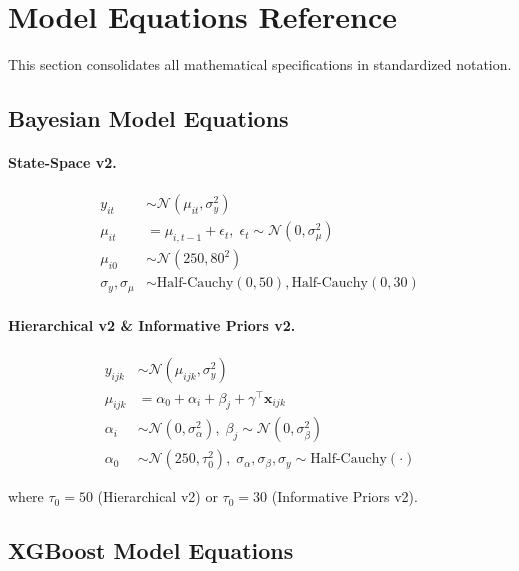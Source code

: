 \section{Model Equations Reference}
\label{sec:equations-reference}

This section consolidates all mathematical specifications in standardized notation.

\subsection{Bayesian Model Equations}

\paragraph{State-Space v2.}
\begin{align}
y_{it} &\sim \mathcal{N}(\mu_{it}, \sigma_y^2) \tag{Observation} \\
\mu_{it} &= \mu_{i,t-1} + \epsilon_t, \; \epsilon_t \sim \mathcal{N}(0, \sigma_\mu^2) \tag{Transition} \\
\mu_{i0} &\sim \mathcal{N}(250, 80^2) \tag{Initial state} \\
\sigma_y, \sigma_\mu &\sim \text{Half-Cauchy}(0, 50), \text{Half-Cauchy}(0, 30) \tag{Priors}
\end{align}

\paragraph{Hierarchical v2 \& Informative Priors v2.}
\begin{align}
y_{ijk} &\sim \mathcal{N}(\mu_{ijk}, \sigma_y^2) \tag{Observation} \\
\mu_{ijk} &= \alpha_0 + \alpha_i + \beta_j + \gamma^\top \mathbf{x}_{ijk} \tag{Linear predictor} \\
\alpha_i &\sim \mathcal{N}(0, \sigma_\alpha^2), \; \beta_j \sim \mathcal{N}(0, \sigma_\beta^2) \tag{Random effects} \\
\alpha_0 &\sim \mathcal{N}(250, \tau_0^2), \; \sigma_\alpha, \sigma_\beta, \sigma_y \sim \text{Half-Cauchy}(\cdot) \tag{Priors}
\end{align}

\noindent where $\tau_0 = 50$ (Hierarchical v2) or $\tau_0 = 30$ (Informative Priors v2).

\subsection{XGBoost Model Equations}

